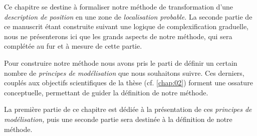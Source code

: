 Ce chapitre se destine à formaliser notre méthode de transformation
d'une \emph{description de position} en une zone de \emph{localisation
  probable.} La seconde partie de ce manuscrit étant construite
suivant une logique de complexification graduelle, nous ne
présenterons ici que les grands aspects de notre méthode, qui sera
complétée au fur et à mesure de cette partie.

Pour construire notre méthode nous avons pris le parti de définir un
certain nombre de \emph{principes de modélisation} que nous souhaitons
suivre. Ces derniers, couplés aux objectifs scientifiques de la thèse
(cf. \autoref{chap:02}) forment une ossature conceptuelle, permettant
de guider la définition de notre méthode.

La première partie de ce chapitre est dédiée à la présentation de ces
\emph{principes de modélisation,} puis une seconde partie sera
destinée à la définition de notre méthode.